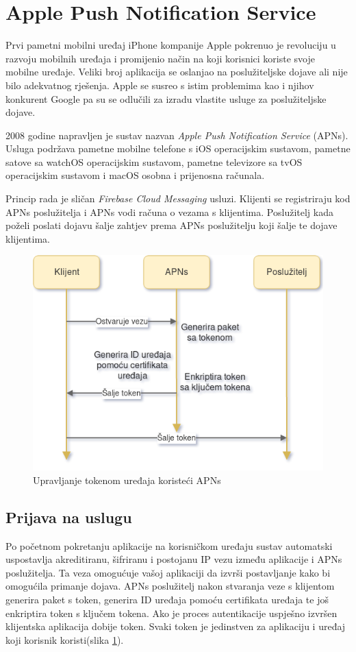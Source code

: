 \documentclass[times, utf8, zavrsni]{fer}
\begin{document}
{\section{Apple Push Notification Service}

Prvi pametni mobilni uređaj iPhone kompanije Apple pokrenuo je revoluciju u razvoju mobilnih uređaja i promijenio način na koji korisnici koriste svoje mobilne uređaje. Veliki broj aplikacija se oslanjao na poslužiteljske dojave ali nije bilo adekvatnog rješenja. Apple se susreo s istim problemima kao i njihov konkurent Google pa su se odlučili za izradu vlastite usluge za poslužiteljske dojave.

2008 godine napravljen je sustav nazvan {\em Apple Push Notification Service} (APNs). Usluga podržava pametne mobilne telefone s iOS operacijskim sustavom, pametne satove sa watchOS operacijskim sustavom, pametne televizore sa tvOS operacijskim sustavom i macOS osobna i prijenosna računala.

Princip rada je sličan {\em Firebase Cloud Messaging} usluzi. Klijenti se registriraju kod APNs poslužitelja i APNs vodi računa o vezama s klijentima. Poslužitelj kada poželi poslati dojavu šalje zahtjev prema APNs poslužitelju koji šalje te dojave klijentima.

\begin{figure}[htb]
\centering
\includegraphics[width=12cm]{img/apns.png}
\caption{Upravljanje tokenom uređaja koristeći APNs}
\label{fig:apns-image}
\end{figure}

\subsection{Prijava na uslugu}
Po početnom pokretanju aplikacije na korisničkom uređaju sustav automatski uspostavlja akreditiranu, šifriranu i postojanu IP vezu između aplikacije i APNs poslužitelja. Ta veza omogućuje vašoj aplikaciji da izvrši postavljanje kako bi omogućila primanje dojava. APNs poslužitelj nakon stvaranja veze s klijentom generira paket s token, generira ID uređaja pomoću certifikata uređaja te još enkriptira token s ključem tokena. Ako je proces autentikacije uspješno izvršen klijentska aplikacija dobije token. Svaki token je jedinstven za aplikaciju i uređaj koji korisnik koristi(slika \ref{fig:apns-image}).

}
\end{document}
